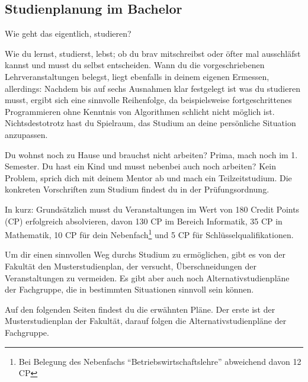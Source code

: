 

\subsection{Studienplanung im Bachelor}

Wie geht das eigentlich, studieren?

Wie du lernst, studierst, lebst; ob du brav mitschreibst oder öfter mal ausschläfst kannst und musst du selbst entscheiden. Wann du die vorgeschriebenen Lehrveranstaltungen belegst, liegt ebenfalls in deinem eigenen Ermessen, allerdings: Nachdem bis auf sechs Ausnahmen klar festgelegt ist was du studieren musst, ergibt sich eine sinnvolle Reihenfolge, da beispielsweise fortgeschrittenes Programmieren ohne Kenntnis von Algorithmen schlicht nicht möglich ist. Nichtsdestotrotz hast du Spielraum, das Studium an deine persönliche Situation anzupassen.


Du wohnst noch zu Hause und brauchst nicht arbeiten? Prima, mach noch \iftoggle{winter}{Theoretische Informatik 1}{Technische Informatik oder Computernetze} im 1. Semester. Du hast ein Kind und musst nebenbei auch noch arbeiten? Kein Problem, sprich dich mit deinem Mentor ab und mach ein Teilzeitstudium. Die konkreten Vorschriften zum Studium findest du in der Prüfungsordnung.


In kurz: Grundsätzlich musst du Veranstaltungen im Wert von 180 Credit Points (CP) erfolgreich absolvieren, davon 130 CP im Bereich Informatik, 35 CP in Mathematik, 10 CP für dein Nebenfach\footnote{Bei Belegung des Nebenfachs \enquote{Betriebswirtschaftslehre} abweichend davon 12 CP} und 5 CP für Schlüsselqualifikationen. 


Um dir einen sinnvollen Weg durchs Studium zu ermöglichen, gibt es von der Fakultät den Musterstudienplan, der versucht, Überschneidungen der Veranstaltungen zu vermeiden. Es gibt aber auch noch Alternativstudienpläne der Fachgruppe, die in bestimmten Situationen sinnvoll sein können. 

Auf den folgenden Seiten findest du die erwähnten Pläne. Der erste ist der Musterstudienplan der Fakultät, darauf folgen die Alternativstudienpläne der Fachgruppe.

